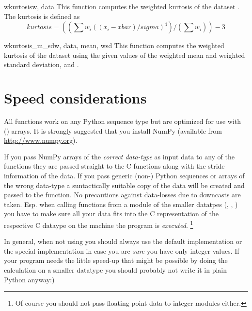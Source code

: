 \begin{funcdesc}{wkurtosis}{w, data}
   This function computes the weighted kurtosis of the dataset . The
   kurtosis is defined as 
   \begin{equation}
      kurtosis = ((\sum w_i ((x_i - xbar)/sigma)^4) / (\sum w_i)) - 3
   \end{equation}
\end{funcdesc}

\begin{funcdesc}{wkurtosis_m_sd}{w, data, mean, wsd}
   This function computes the weighted kurtosis of the dataset  using
   the given values of the weighted mean and weighted standard deviation,
    and .
\end{funcdesc}



\section{Speed considerations}
\label{sec:stat:speed-considerations}

All functions work on any Python sequence type but are optimized for use with
\NUMPY{} (\numpy{}) arrays. It is strongly suggested that you install NumPy
(available from \url{http://www.numpy.org}).

If you pass NumPy arrays of the \emph{correct data-type} as input data to any
of the functions they are passed straight to the C functions along with the
stride information of the data. If you pass generic (non-\numpy{}) Python
sequences or \numpy{} arrays of the wrong data-type a suntactically suitable
copy of the data will be created and passed to the function. No precautions
against data-losses due to downcasts are taken. Esp. when calling functions
from a module of the smaller datatpes (, ,
) you have to make sure all your data fits into the C
representation of the respective C dataype on the machine the program is
\emph{executed}. \footnote{Of course you should not pass floating point data to
   integer modules either.}

In general, when not using \numpy{} you should always use the default
implementation  or the special implementation
 in case you are \emph{sure} you have only
integer values. If your program needs the little speed-up that might be
possible by doing the calculation on a smaller datatype you should probably not
write it in plain Python anyway:)


